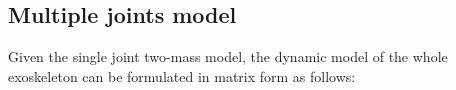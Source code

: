 \subsection{Multiple joints model} \label{Full dynamics model}

Given the single joint two-mass model, the dynamic model of the whole exoskeleton can be formulated in matrix form as follows:
\setlength{\arraycolsep}{0.0em}



